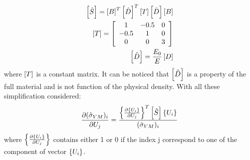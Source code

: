 \begin{eqnarray}
\left[{\hat{S}}\right]=\left[{B}\right]^T\left[{\hat{D}}\right]^T\left[{T}\right]\left[{\hat{D}}\right]\left[{B}\right]\\
\left[{T}\right]=\left[{\begin{array}{ccc}
1 & -0.5 & 0\\
-0.5 & 1 & 0\\
0 & 0 & 3
\end{array}}\right]\\
\left[{\hat{D}}\right]=\frac{E_0}{E}\left[{D}\right]
\end{eqnarray}
where $\left[{T}\right]$ is a constant matrix. It can be noticed that $\left[{\hat{D}}\right]$ is a property of the full material and is not function of the physical density.
With all these simplification considered:
\begin{equation}
\frac{\partial (\hat{\sigma}_{VM})_i} {\partial U_j}=\frac{\left\lbrace{\frac{\partial \ensuremath\left\lbrace{U_i}\right \rbrace}{\partial U_j}}\right \rbrace^T\left[{\hat{S}}\right]\left\lbrace{U_i}\right \rbrace }{(\hat{\sigma}_{VM})_i}
\end{equation}
where $\left\lbrace{\frac{\partial \ensuremath\left\lbrace{U_i}\right \rbrace}{\partial U_j}}\right \rbrace$ contains either 1 or 0 if the index j correspond to one of the component of vector $ \left\lbrace{U_i}\right \rbrace$. 
